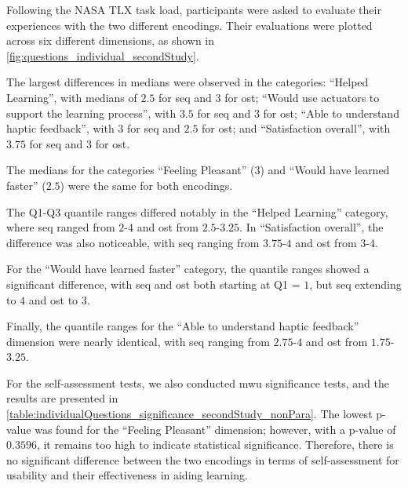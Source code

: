 Following the NASA TLX task load, participants were asked to evaluate their experiences with the two different encodings. Their evaluations were plotted across six different dimensions, as shown in \autoref{fig:questions_individual_secondStudy}.

The largest differences in medians were observed in the categories: \enquote{Helped Learning}, with medians of $2.5$ for \gls{seq} and $3$ for \gls{ost}; \enquote{Would use actuators to support the learning process}, with $3.5$ for \gls{seq} and $3$ for \gls{ost}; \enquote{Able to understand haptic feedback}, with $3$ for \gls{seq} and $2.5$ for \gls{ost}; and \enquote{Satisfaction overall}, with $3.75$ for \gls{seq} and $3$ for \gls{ost}. 

The medians for the categories \enquote{Feeling Pleasant} ($3$) and \enquote{Would have learned faster} ($2.5$) were the same for both encodings. 

The Q1-Q3 quantile ranges differed notably in the \enquote{Helped Learning} category, where \gls{seq} ranged from $2$-$4$ and \gls{ost} from $2.5$-$3.25$. In \enquote{Satisfaction overall}, the difference was also noticeable, with \gls{seq} ranging from $3.75$-$4$ and \gls{ost} from $3$-$4$. 

For the \enquote{Would have learned faster} category, the quantile ranges showed a significant difference, with \gls{seq} and \gls{ost} both starting at Q1 = $1$, but \gls{seq} extending to $4$ and \gls{ost} to $3$. 

Finally, the quantile ranges for the \enquote{Able to understand haptic feedback} dimension were nearly identical, with \gls{seq} ranging from $2.75$-$4$ and \gls{ost} from $1.75$-$3.25$.

For the self-assessment tests, we also conducted \gls{mwu} significance tests, and the results are presented in \autoref{table:individualQuestions_significance_secondStudy_nonPara}.
The lowest p-value was found for the \enquote{Feeling Pleasant} dimension; however, with a p-value of $0.3596$, it remains too high to indicate statistical significance.
Therefore, there is no significant difference between the two encodings in terms of self-assessment for usability and their effectiveness in aiding learning.

